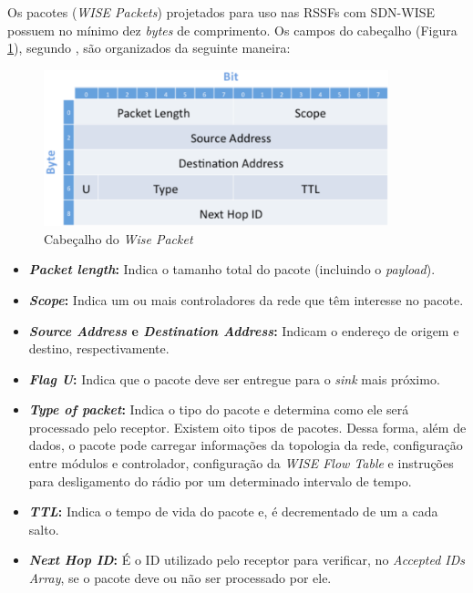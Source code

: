 Os pacotes (\textit{WISE Packets}) projetados para uso nas \ac{RSSF}s com \ac{SDN-WISE} possuem no mínimo dez \textit{bytes} de comprimento. Os campos do cabeçalho (Figura \ref{WISEPacket}), segundo , são organizados da seguinte maneira:

\begin{figure}[h!]
    \centering
    \includegraphics[width=10cm]{figs/WISEPacket.png}
    \caption{Cabeçalho do \textit{Wise Packet} \cite{galluccio2015sdn}}
    \label{WISEPacket}
\end{figure}


\begin{itemize} 
    \item \textbf{\textit{Packet length}:} Indica o tamanho total do pacote (incluindo o \textit{payload}).
    \item \textbf{\textit{Scope}:} Indica um ou mais controladores da rede que têm interesse no pacote.
    \item \textbf{\textit{Source Address} e \textit{Destination Address}:} Indicam o endereço de origem e destino, respectivamente.
    \item \textbf{\textit{Flag U}:} Indica que o pacote deve ser entregue para o \textit{sink} mais próximo.
    \item \textbf{\textit{Type of packet}:} Indica o tipo do pacote e determina como ele será processado pelo receptor. Existem oito tipos de pacotes. Dessa forma, além de dados, o pacote pode carregar informações da topologia da rede, configuração entre módulos e controlador, configuração da \textit{WISE Flow Table} e instruções para desligamento do rádio por um determinado intervalo de tempo.
    \item \textbf{\textit{\ac{TTL}}:} Indica o tempo de vida do pacote e, é decrementado de um a cada salto.
    \item \textbf{\textit{Next Hop ID}:} É o \ac{ID} utilizado pelo receptor para verificar, no \textit{Accepted IDs Array}, se o pacote deve ou não ser processado por ele. 
\end{itemize}


